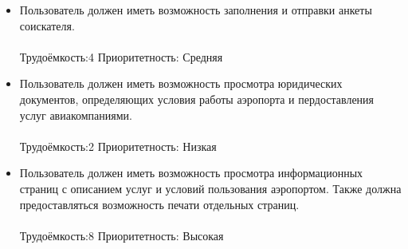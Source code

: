 \begin{enumerate}
\begin{itemize}
                  \\
            \item Пользователь должен иметь возможность
                  заполнения и отправки анкеты соискателя.
                  \\\\
                  Трудоёмкость:4    Приоритетность: Средняя
                  \\
            \item Пользователь должен иметь возможность
                  просмотра юридических документов, определяющих
                  условия работы аэропорта и пердоставления
                  услуг авиакомпаниями.
                  \\\\
                  Трудоёмкость:2    Приоритетность: Низкая
                  \\
            \item Пользователь должен иметь возможность просмотра
                  информационных страниц с описанием услуг и
                  условий пользования аэропортом. Также должна
                  предоставляться возможность печати отдельных
                  страниц.
                  \\\\
                  Трудоёмкость:8    Приоритетность: Высокая
      \end{itemize}
\end{enumerate}
